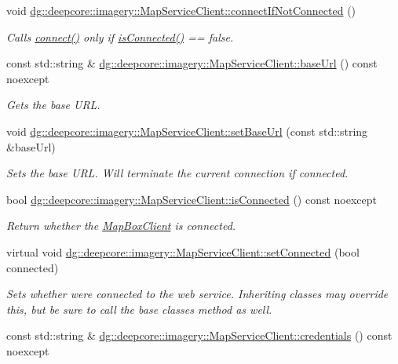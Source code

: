\begin{DoxyCompactItemize}
void \hyperlink{group___imagery_module_gafbcd14e6930fee4427877f52e36613ba}{dg\+::deepcore\+::imagery\+::\+Map\+Service\+Client\+::connect\+If\+Not\+Connected} ()
\begin{DoxyCompactList}\small\item\em Calls \hyperlink{group___imagery_module_ga5e5f58c725cafba7966936f688a6ade0}{connect()} only if \hyperlink{group___imagery_module_gab0c42dc6fd8965108c0bc5ef80d4d4b3}{is\+Connected()} == false. \end{DoxyCompactList}\item 
const std\+::string \& \hyperlink{group___imagery_module_gadf279770cec6dc9ac56348bb2e1b29e1}{dg\+::deepcore\+::imagery\+::\+Map\+Service\+Client\+::base\+Url} () const noexcept
\begin{DoxyCompactList}\small\item\em Gets the base U\+RL. \end{DoxyCompactList}\item 
void \hyperlink{group___imagery_module_ga39b179cd4494f868a7807f616e04ee24}{dg\+::deepcore\+::imagery\+::\+Map\+Service\+Client\+::set\+Base\+Url} (const std\+::string \&base\+Url)
\begin{DoxyCompactList}\small\item\em Sets the base U\+RL. Will terminate the current connection if connected. \end{DoxyCompactList}\item 
bool \hyperlink{group___imagery_module_gab0c42dc6fd8965108c0bc5ef80d4d4b3}{dg\+::deepcore\+::imagery\+::\+Map\+Service\+Client\+::is\+Connected} () const noexcept
\begin{DoxyCompactList}\small\item\em Return whether the \hyperlink{classdg_1_1deepcore_1_1imagery_1_1_map_box_client}{Map\+Box\+Client} is connected. \end{DoxyCompactList}\item 
virtual void \hyperlink{group___imagery_module_gadf7a167ee936ff1819c8ede7933cc6db}{dg\+::deepcore\+::imagery\+::\+Map\+Service\+Client\+::set\+Connected} (bool connected)
\begin{DoxyCompactList}\small\item\em Sets whether we\textquotesingle{}re connected to the web service. Inheriting classes may override this, but be sure to call the base classe\textquotesingle{}s method as well. \end{DoxyCompactList}\item 
const std\+::string \& \hyperlink{group___imagery_module_gac4c03ea635c336ca2fe7de533706c11c}{dg\+::deepcore\+::imagery\+::\+Map\+Service\+Client\+::credentials} () const noexcept

\end{DoxyCompactItemize}
